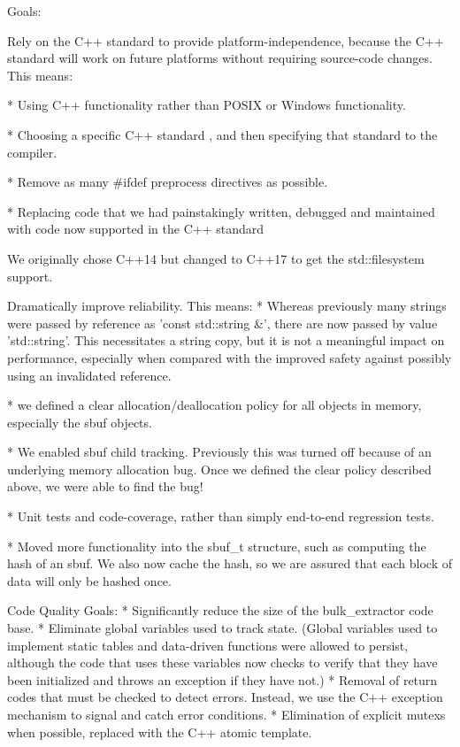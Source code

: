 
Goals:

Rely on the C++ standard to provide platform-independence, because the
C++ standard will work on future platforms without requiring
source-code changes. This means:

* Using C++ functionality rather than POSIX or Windows functionality.

* Choosing a specific C++ standard , and then
specifying that standard to the compiler.


* Remove as many \#ifdef preprocess directives as possible.

* Replacing code that we had painstakingly written, debugged and
maintained with code now supported in the C++ standard

We originally chose C++14 but changed to C++17 to get the
std::filesystem support.


Dramatically improve reliability. This means:
* Whereas previously many strings were passed by reference as 'const std::string &',
there are now passed by value 'std::string'. This necessitates a
string copy, but it is not a meaningful impact on performance,
especially when compared with the improved safety against possibly
using an invalidated reference.

* we defined a clear allocation/deallocation policy for all
objects in memory, especially the sbuf objects.

* We enabled sbuf child tracking. Previously this was turned off
because of an underlying memory allocation bug. Once we defined the
clear policy described above, we were able to find the bug!

* Unit tests and code-coverage, rather than simply end-to-end
regression tests.

* Moved more functionality into the sbuf_t structure, such as
computing the hash of an sbuf. We also now cache the hash, so we are
assured that each block of data will only be hashed once.


Code Quality Goals:
* Significantly reduce the size of the bulk_extractor code base.
* Eliminate global variables used to track state. (Global variables
used to implement static tables and data-driven functions were allowed
to persist, although the code that uses these variables now checks to
verify that they have been initialized and throws an exception if they
have not.)
* Removal of return codes that must be checked to detect
errors. Instead, we use the C++ exception mechanism to signal and
catch error conditions.
* Elimination of explicit mutexs when possible, replaced with the C++
atomic template.

